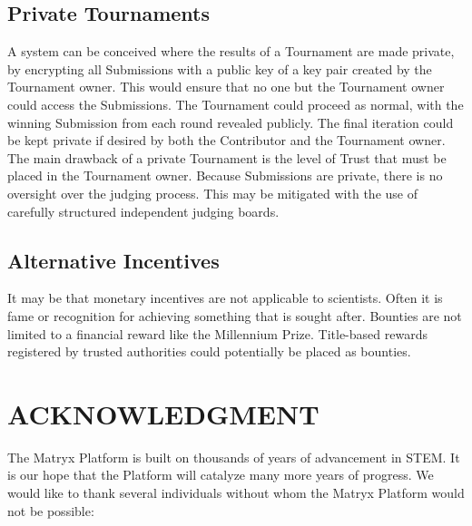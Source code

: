 \documentclass[a4paper, 10pt, conference]{ieeeconf}      %
\begin{document}
\subsection{Private Tournaments}\label{privateTournaments}
A system can be conceived where the results of a Tournament are made private, by encrypting all Submissions with a public key of a key pair created by the Tournament owner. 
This would ensure that no one but the Tournament owner could access the Submissions. 
The Tournament could proceed as normal, with the winning Submission from each round revealed publicly. 
The final iteration could be kept private if desired by both the Contributor and the Tournament owner. 
The main drawback of a private Tournament is the level of Trust that must be placed in the Tournament owner. 
Because Submissions are private, there is no oversight over the judging process. 
This may be mitigated with the use of carefully structured independent judging boards.

\subsection{Alternative Incentives}\label{alternative incentives}
It may be that monetary incentives are not applicable to scientists. 
Often it is fame or recognition for achieving something that is sought after. 
Bounties are not limited to a financial reward like the Millennium Prize. 
Title-based rewards registered by trusted authorities could potentially be placed as bounties.

\iffalse
\section*{ACKNOWLEDGMENT}


The Matryx Platform is built on thousands of years of advancement in STEM. 
It is our hope that the Platform will catalyze many more years of progress. 
We would like to thank several individuals without whom the Matryx Platform would not be possible:
 
\end{document}
